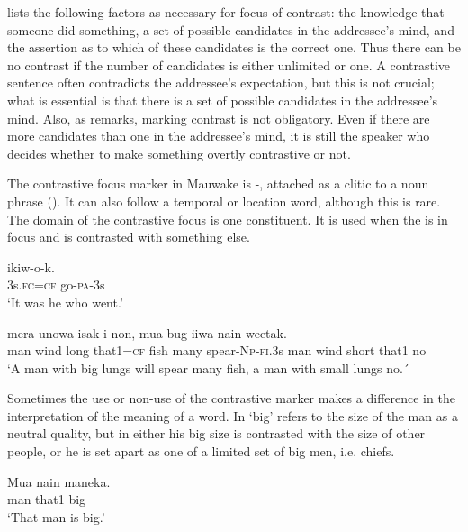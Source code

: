 \citet{Chafe1976} lists the following factors as necessary for focus of contrast: the knowledge that someone did something, a set of possible candidates in the addressee's mind, and the assertion as to which of these candidates is the correct one. Thus there can be no contrast if the number of candidates is either unlimited or one. A contrastive sentence often contradicts the addressee's expectation, but this is not crucial; what is essential is that there is a set of possible candidates in the addressee's mind. Also, as  \citet[348]{Linde1979} remarks, marking contrast is not obligatory. Even if there are more candidates than one in the addressee's mind, it is still the speaker who decides whether to make something overtly contrastive or not.  

The contrastive focus marker in Mauwake is -, attached as a clitic to a noun phrase (). It can also follow a temporal or location word, although this is rare. The domain of the contrastive focus is one constituent. It is used when the  is in focus and is contrasted with something else. 

\ea%
\label{ex:x1688}
\gll {}  ikiw-o-k. \\
3s.\textsc{fc}=\textsc{cf}  go-\textsc{pa}-3s      \\
\glt`It was he who went.'
\z


\ea%
\label{ex:x1689}
\gll {}     mera  unowa  isak-i-non, mua  bug  iiwa  nain  weetak. \\
man  wind  long  that1=\textsc{cf}  fish  many  spear-\textsc{Np}-\textsc{fi}.3s man  wind  short  that1  no\\
\glt`A man with big lungs will spear many fish, a man with small lungs no.´ 
\z


Sometimes the use or non-use of the contrastive marker makes a difference in the interpretation of the meaning of a word. In   `big' refers to the size of the man as a neutral quality, but in  either his big size is contrasted with the size of other people, or he is set apart as one of a limited set of big men, i.e. chiefs. 

\ea%
\label{ex:x1690}
\gll Mua  nain  maneka. \\
man  that1  big      \\
\glt`That man is big.'
\z



